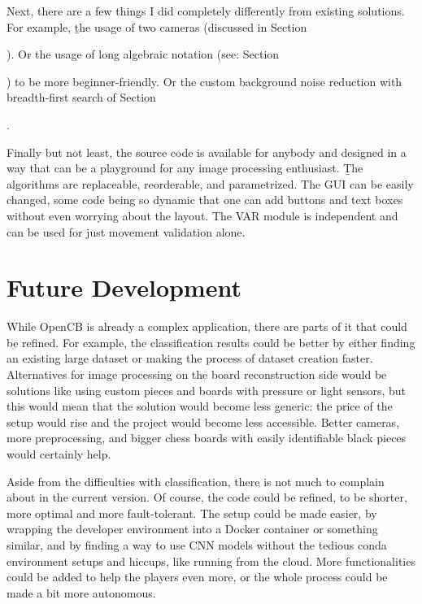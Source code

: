 Next, there are a few things I did completely differently from existing solutions. For example, \b{the usage of two cameras} (discussed in Section {). Or the usage of long algebraic notation (see: Section {) to be more beginner-friendly. Or the custom background noise reduction with breadth-first search of Section {.

Finally but not least, the source code is available for anybody and designed in a way that can be a playground for any image processing enthusiast. \b{The algorithms are replaceable, reorderable, and parametrized}. The GUI can be easily changed, some code being so dynamic that one can add buttons and text boxes without even worrying about the layout. The VAR module is independent and can be used for just movement validation alone.




\section{Future Development}

While OpenCB is already a complex application, there are parts of it that could be refined. For example, the classification results could be better by either finding an existing large dataset or making the process of dataset creation faster. Alternatives for image processing on the board reconstruction side would be solutions like using custom pieces and boards with pressure or light sensors, but this would mean that the solution would become less generic: the price of the setup would rise and the project would become less accessible. Better cameras, more preprocessing, and bigger chess boards with easily identifiable black pieces would certainly help.

Aside from the difficulties with classification, there is not much to complain about in the current version. Of course, the code could be refined, to be shorter, more optimal and more fault-tolerant. The setup could be made easier, by wrapping the developer environment into a Docker container or something similar, and by finding a way to use CNN models without the tedious conda environment setups and hiccups, like running from the cloud. More functionalities could be added to help the players even more, or the whole process could be made a bit more autonomous. 



}}}
